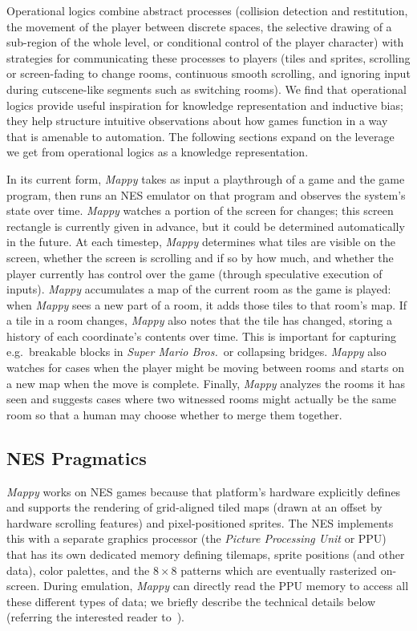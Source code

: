 \documentclass[a4paper]{article}
\begin{document}
Operational logics combine abstract processes (collision detection and restitution, the movement of the player between discrete spaces, the selective drawing of a sub-region of the whole level, or conditional control of the player character) with strategies for communicating these processes to players (tiles and sprites, scrolling or screen-fading to change rooms, continuous smooth scrolling, and ignoring input during cutscene-like segments such as switching rooms).
We find that operational logics provide useful inspiration for knowledge representation and inductive bias; they help structure intuitive observations about how games function in a way that is amenable to automation.
The following sections expand on the leverage we get from operational logics as a knowledge representation.

In its current form, \emph{Mappy} takes as input a playthrough of a game and the game program, then runs an NES emulator on that program and observes the system's state over time.
\emph{Mappy} watches a portion of the screen for changes; this screen rectangle is currently given in advance, but it could be determined automatically in the future.
At each timestep, \emph{Mappy} determines what tiles are visible on the screen, whether the screen is scrolling and if so by how much, and whether the player currently has control over the game (through speculative execution of inputs).
\emph{Mappy} accumulates a map of the current room as the game is played: when \emph{Mappy} sees a new part of a room, it adds those tiles to that room's map.
If a tile in a room changes, \emph{Mappy} also notes that the tile has changed, storing a history of each coordinate's contents over time.
This is important for capturing e.g.\ breakable blocks in \emph{Super Mario Bros.}\ or collapsing bridges.
\emph{Mappy} also watches for cases when the player might be moving between rooms and starts on a new map when the move is complete.
Finally, \emph{Mappy} analyzes the rooms it has seen and suggests cases where two witnessed rooms might actually be the same room so that a human may choose whether to merge them together.

\subsection{NES Pragmatics}

\emph{Mappy} works on NES games because that platform's hardware explicitly defines and supports the rendering of grid-aligned tiled maps (drawn at an offset by hardware scrolling features) and pixel-positioned sprites.
The NES implements this with a separate graphics processor (the \emph{Picture Processing Unit} or PPU) that has its own dedicated memory defining tilemaps, sprite positions (and other data), color palettes, and the \(8 \times 8\) patterns which are eventually rasterized on-screen.
During emulation, \emph{Mappy} can directly read the PPU memory to access all these different types of data; we briefly describe the technical details below (referring the interested reader to~\cite{nesdev}).
\end{document}
